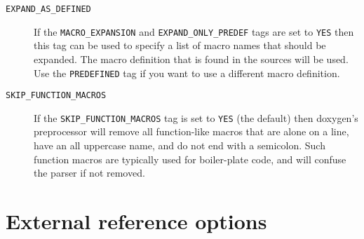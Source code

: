 \begin{description}
\label{config_cfg_expand_as_defined}
\hypertarget{config_cfg_expand_as_defined}{}
 \item[{\tt EXPAND\_\-AS\_\-DEFINED} ] If the {\tt MACRO\_\-EXPANSION} and {\tt EXPAND\_\-ONLY\_\-PREDEF} tags are set to {\tt YES} then this tag can be used to specify a list of macro names that should be expanded. The macro definition that is found in the sources will be used. Use the {\tt PREDEFINED} tag if you want to use a different macro definition.

\label{config_cfg_skip_function_macros}
\hypertarget{config_cfg_skip_function_macros}{}
 \item[{\tt SKIP\_\-FUNCTION\_\-MACROS} ] If the {\tt SKIP\_\-FUNCTION\_\-MACROS} tag is set to {\tt YES} (the default) then doxygen's preprocessor will remove all function-like macros that are alone on a line, have an all uppercase name, and do not end with a semicolon. Such function macros are typically used for boiler-plate code, and will confuse the parser if not removed.

\end{description}
\hypertarget{config_config_extref}{}\section{External reference options}\label{config_config_extref}
\label{config_cfg_tagfiles}
\hypertarget{config_cfg_tagfiles}{}
